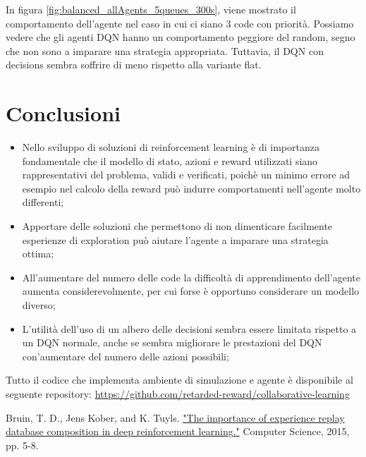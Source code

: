 \documentclass[conference]{IEEEtran}
\begin{document}
In figura \autoref{fig:balanced_allAgents_5queues_300s}, viene mostrato il comportamento 
dell'agente nel caso in cui ci siano 3 code con priorità. Possiamo vedere che gli agenti 
DQN hanno un comportamento peggiore del random, segno che non sono a imparare una 
strategia appropriata. Tuttavia, il DQN con decisions sembra soffrire di meno rispetto
alla variante flat.

\section{Conclusioni}
\begin{itemize}
    \item Nello sviluppo di soluzioni di reinforcement learning è di importanza fondamentale
    che il modello di stato, azioni e reward utilizzati siano rappresentativi del 
    problema, validi e verificati, poichè un minimo errore ad esempio nel calcolo della
    reward può indurre comportamenti nell'agente molto differenti;
    \item Apportare delle soluzioni che permettono di non dimenticare facilmente
    esperienze di exploration può aiutare l'agente a imparare una strategia ottima;
    \item All'aumentare del numero delle code la difficoltà di apprendimento dell'agente
    aumenta considerevolmente, per cui forse è opportuno considerare un modello diverso;
    \item L'utilità dell'uso di un albero delle decisioni sembra essere limitata
    rispetto a un DQN normale, anche se sembra migliorare le prestazioni del DQN
    con'aumentare del numero delle azioni possibili;
\end{itemize}

Tutto il codice che implementa ambiente di simulazione e agente è disponibile al 
seguente repository: \href{https://github.com/retarded-reward/collaborative-learning}{https://github.com/retarded-reward/collaborative-learning}

\begin{thebibliography}{00}
     Bruin, T. D., Jens Kober, and K. Tuyls. \href{https://rll.berkeley.edu/deeprlworkshop/papers/database_composition.pdf}{"The importance of experience replay database composition in deep reinforcement learning."} Computer Science, 2015, pp. 5-8.
\end{thebibliography}

\end{document}
